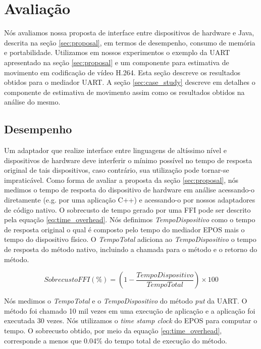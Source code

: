 \section{Avaliação}
\label{sec:eval}
Nós avaliamos nossa proposta de interface entre dispositivos de hardware e Java,
descrita na seção \ref{sec:proposal}, em termos de desempenho, consumo de 
memória e portabilidade.
Utilizamos em nossos experimentos o exemplo da UART apresentado na seção 
\ref{sec:proposal} e um componente para estimativa de movimento em codificação 
de vídeo H.264.
Esta seção descreve os resultados obtidos para o mediador UART.
A seção \ref{sec:case_study} descreve em detalhes o componente de estimativa 
de movimento assim como os resultados obtidos na análise do mesmo.

\subsection{Desempenho}
Um adaptador que realize interface entre linguagens de altíssimo nível e 
dispositivos de hardware deve interferir o mínimo possível no tempo de resposta
original de tais dispositivos, caso contrário, sua utilização pode tornar-se
impraticável.
Como forma de avaliar a proposta da seção \ref{sec:proposal}, nós medimos o 
tempo de resposta do dispositivo de hardware em análise acessando-o diretamente
(e.g. por uma aplicação C++) e acessando-o por nossos adaptadores de código
nativo.
O sobrecusto de tempo gerado por uma FFI
pode ser descrito pela equação \ref{eq:time_overhead}.
Nós definimos \emph{TempoDispositivo} como o tempo de resposta original o qual
é composto pelo tempo do mediador EPOS mais o tempo do dispositivo físico.
O \emph{TempoTotal} adiciona ao \emph{TempoDispositivo} o tempo de resposta
do método nativo, incluindo a chamada para o método e o retorno do método.

\begin{equation}
\label{eq:time_overhead}
SobrecustoFFI (\%) = \left ( 1 - \frac{TempoDispositivo} {TempoTotal} \right ) \times 100
\end{equation}

Nós medimos o \emph{TempoTotal} e o \emph{TempoDispositivo} do método \emph{put}
da UART.
O método foi chamado 10 mil vezes em uma execução de aplicação e a aplicação foi
executada 30 vezes. 
Nós utilizamos o \emph{time stamp clock} do EPOS para computar o tempo. 
O sobrecusto obtido, por meio da equação \ref{eq:time_overhead}, corresponde a
menos que 0.04\% do tempo total de execução do método.

